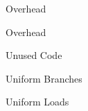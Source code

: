 \documentclass[xcolor={usenames,dvipsnames}, aspectratio=169, 12pt]{beamer}
\begin{document}
\begin{frame}{Overhead}

\end{frame}

\begin{frame}{Overhead}
\end{frame}

\begin{frame}{Unused Code}
	
\end{frame}

\begin{frame}{Uniform Branches}

\end{frame}

\begin{frame}{Uniform Loads}

\end{frame}
\end{document}
